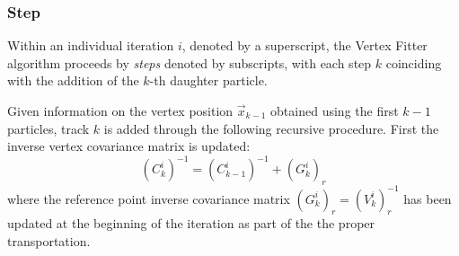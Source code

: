 %
%
%

\subsubsection{Step}
Within an individual iteration $i$, denoted by a superscript, the Vertex Fitter algorithm proceeds by \textit{steps} denoted by subscripts, with each step $k$ coinciding with the addition of the $k$-th daughter particle.

Given information on the vertex position $\vec{x}_{k-1}$ obtained using the first $k-1$ particles, track $k$ is added through the following recursive procedure.
First the inverse vertex covariance matrix is updated:
\begin{equation}
{(C^i_k)}^{-1} = {(C^i_{k-1})}^{-1}
+
{(G_k^i)}_r
\label{eq:3:VF_new_inv_covmatrix}
\end{equation}
where the reference point inverse covariance matrix ${(G_k^i)}_r = {(V_k^i)}_r^{-1}$ has been updated at the beginning of the iteration as part of the the proper transportation.

